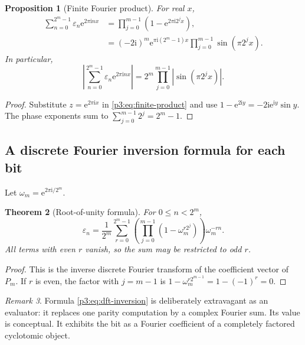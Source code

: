 \documentclass[11pt,oneside]{article}
\newtheorem{theorem}{Theorem}[section]
\newtheorem{proposition}[theorem]{Proposition}
\theoremstyle{definition}
\theoremstyle{remark}
\newtheorem{remark}[theorem]{Remark}
\newcommand{\e}{\mathrm e}
\newcommand{\ii}{\mathrm i}
\newcommand{\eps}{\varepsilon}
\newcommand{\1}{\mathbf 1}
\begin{document}
\begin{proposition}[Finite Fourier product]
\label{p3:prop:unit-circle}
For real \(x\),
\begin{align}
 \sum_{n=0}^{2^m-1}\eps_n\e^{2\pi\ii nx}
 &=\prod_{j=0}^{m-1}\left(1-\e^{2\pi\ii2^jx}\right),
 \label{p3:eq:fourier-product}\\
 &=(-2\ii)^m\e^{\pi\ii(2^m-1)x}
   \prod_{j=0}^{m-1}\sin(\pi2^jx).                         \label{p3:eq:sine-fourier}
\end{align}
In particular,
\begin{equation}
 \left|\sum_{n=0}^{2^m-1}\eps_n\e^{2\pi\ii nx}\right|
 =2^m\prod_{j=0}^{m-1}|\sin(\pi2^jx)|.
 \label{p3:eq:fourier-magnitude}
\end{equation}
\end{proposition}

\begin{proof}
Substitute \(z=\e^{2\pi\ii x}\) in \eqref{p3:eq:finite-product} and use
\(1-\e^{2\ii y}=-2\ii\e^{\ii y}\sin y\).  The phase exponents sum to
\(\sum_{j=0}^{m-1}2^j=2^m-1\).
\end{proof}

\subsection{A discrete Fourier inversion formula for each bit}

Let \(\omega_m=\e^{2\pi\ii/2^m}\).

\begin{theorem}[Root-of-unity formula]
\label{p3:thm:dft}
For \(0\le n<2^m\),
\begin{equation}
 \boxed{
 \eps_n=\frac1{2^m}
 \sum_{r=0}^{2^m-1}
 \left(\prod_{j=0}^{m-1}(1-\omega_m^{r2^j})\right)
 \omega_m^{-rn}.}
 \label{p3:eq:dft-inversion}
\end{equation}
All terms with even \(r\) vanish, so the sum may be restricted to odd \(r\).
\end{theorem}

\begin{proof}
This is the inverse discrete Fourier transform of the coefficient vector of \(P_m\).  If
\(r\) is even, the factor with \(j=m-1\) is
\(1-\omega_m^{r2^{m-1}}=1-(-1)^r=0\).
\end{proof}

\begin{remark}
Formula \eqref{p3:eq:dft-inversion} is deliberately extravagant as an evaluator: it replaces one
parity computation by a complex Fourier sum.  Its value is conceptual.  It exhibits the bit
as a Fourier coefficient of a completely factored cyclotomic object.
\end{remark}
\end{document}
